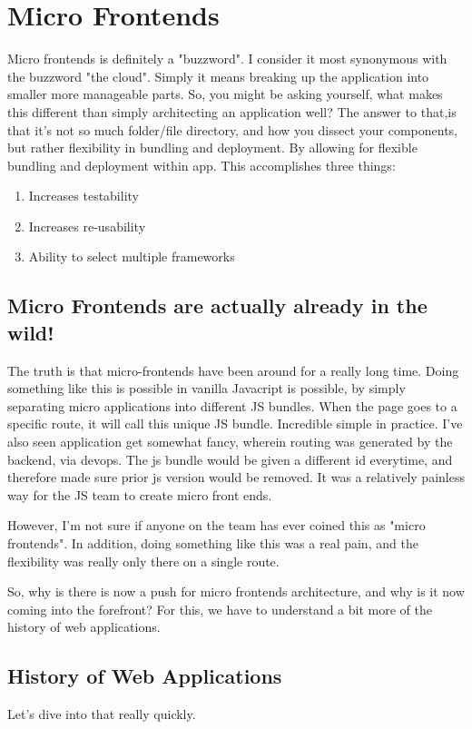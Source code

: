 \chapter{ Micro Frontends }
Micro frontends is definitely a "buzzword". I consider it most synonymous with the buzzword "the cloud". Simply it means breaking up the application into smaller more manageable parts. So, you might be asking yourself, what makes this different than simply architecting an application well? The answer to that,is that it's not so much folder/file directory, and how you dissect your components, but rather flexibility in bundling and deployment. By allowing for flexible bundling and deployment within app. This accomplishes three things: 
\begin{enumerate}
  \item Increases testability
  \item Increases re-usability
  \item Ability to select multiple frameworks
\end{enumerate}

\section{Micro Frontends are actually already in the wild!}

The truth is that micro-frontends have been around for a really long time. Doing something like this is possible in vanilla Javacript is possible, by simply separating micro applications into different JS bundles. When the page goes to a specific route, it will call this unique JS bundle. Incredible simple in practice. I've also seen application get somewhat fancy, wherein routing was generated by the backend, via devops. The js bundle would be given a different id everytime, and therefore made sure prior js version would be removed. It was a relatively painless way for the JS team to create micro front ends. 

However, I'm not sure if anyone on the team has ever coined this as "micro frontends". In addition, doing something like this was a real pain, and the flexibility was really only there on a single route. 

So, why is there is now a push for micro frontends architecture, and why is it now coming into the forefront? For this, we have to understand a bit more of the history of web applications.

\section{History of Web Applications}
Let's dive into that really quickly.

